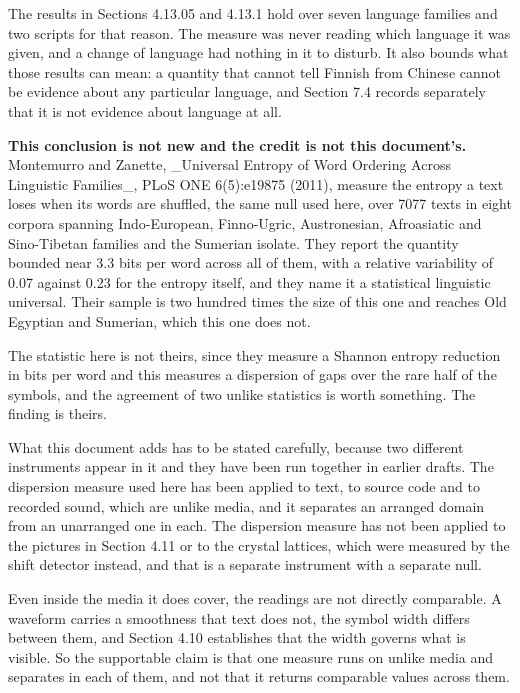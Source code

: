 The results in Sections 4.13.05 and 4.13.1 hold over seven language families and two scripts for that reason. The measure was never reading which language it was given, and a change of language had nothing in it to disturb. It also bounds what those results can mean: a quantity that cannot tell Finnish from Chinese cannot be evidence about any particular language, and Section 7.4 records separately that it is not evidence about language at all.

\textbf{This conclusion is not new and the credit is not this document's.} Montemurro and Zanette, \_Universal Entropy of Word Ordering Across Linguistic Families\_, PLoS ONE 6(5):e19875 (2011), measure the entropy a text loses when its words are shuffled, the same null used here, over 7077 texts in eight corpora spanning Indo-European, Finno-Ugric, Austronesian, Afroasiatic and Sino-Tibetan families and the Sumerian isolate. They report the quantity bounded near 3.3 bits per word across all of them, with a relative variability of 0.07 against 0.23 for the entropy itself, and they name it a statistical linguistic universal. Their sample is two hundred times the size of this one and reaches Old Egyptian and Sumerian, which this one does not.

The statistic here is not theirs, since they measure a Shannon entropy reduction in bits per word and this measures a dispersion of gaps over the rare half of the symbols, and the agreement of two unlike statistics is worth something. The finding is theirs.

What this document adds has to be stated carefully, because two different instruments appear in it and they have been run together in earlier drafts. The dispersion measure used here has been applied to text, to source code and to recorded sound, which are unlike media, and it separates an arranged domain from an unarranged one in each. The dispersion measure has not been applied to the pictures in Section 4.11 or to the crystal lattices, which were measured by the shift detector instead, and that is a separate instrument with a separate null.

Even inside the media it does cover, the readings are not directly comparable. A waveform carries a smoothness that text does not, the symbol width differs between them, and Section 4.10 establishes that the width governs what is visible. So the supportable claim is that one measure runs on unlike media and separates in each of them, and not that it returns comparable values across them.

